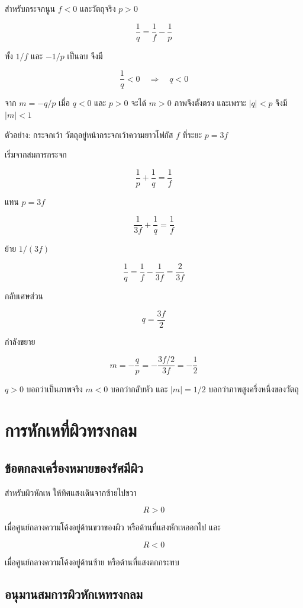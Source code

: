 สำหรับกระจกนูน $f<0$ และวัตถุจริง $p>0$

\[
\frac{1}{q}=\frac{1}{f}-\frac{1}{p}
\]

ทั้ง $1/f$ และ $-1/p$ เป็นลบ จึงมี

\[
\frac{1}{q}<0
\quad\Rightarrow\quad
q<0
\]

จาก $m=-q/p$ เมื่อ $q<0$ และ $p>0$ จะได้ $m>0$ ภาพจึงตั้งตรง และเพราะ $|q|<p$ จึงมี $|m|<1$

\begin{examplebox}{ตัวอย่าง: กระจกเว้า}
วัตถุอยู่หน้ากระจกเว้าความยาวโฟกัส $f$ ที่ระยะ $p=3f$

เริ่มจากสมการกระจก

\[
\frac{1}{p}+\frac{1}{q}=\frac{1}{f}
\]

แทน $p=3f$

\[
\frac{1}{3f}+\frac{1}{q}=\frac{1}{f}
\]

ย้าย $1/(3f)$

\[
\frac{1}{q}
=
\frac{1}{f}-\frac{1}{3f}
=
\frac{2}{3f}
\]

กลับเศษส่วน

\[
q=\frac{3f}{2}
\]

กำลังขยาย

\[
m=-\frac{q}{p}
=-\frac{3f/2}{3f}
=-\frac{1}{2}
\]

$q>0$ บอกว่าเป็นภาพจริง $m<0$ บอกว่ากลับหัว และ $|m|=1/2$ บอกว่าภาพสูงครึ่งหนึ่งของวัตถุ
\end{examplebox}

\section{การหักเหที่ผิวทรงกลม}

\subsection{ข้อตกลงเครื่องหมายของรัศมีผิว}

สำหรับผิวหักเห ให้ทิศแสงเดินจากซ้ายไปขวา

\[
R>0
\]

เมื่อศูนย์กลางความโค้งอยู่ด้านขวาของผิว หรือด้านที่แสงหักเหออกไป และ

\[
R<0
\]

เมื่อศูนย์กลางความโค้งอยู่ด้านซ้าย หรือด้านที่แสงตกกระทบ

\subsection{อนุมานสมการผิวหักเหทรงกลม}

